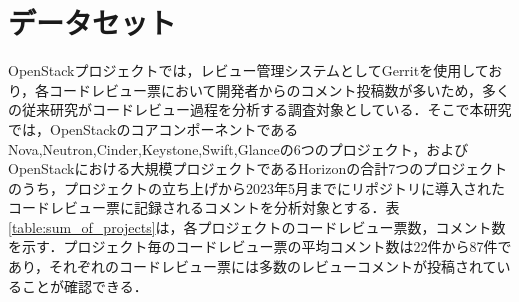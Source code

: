 \documentclass[11pt]{jreport}
\newcommand{\todo}[1]{\colorbox{yellow}{{\bf TODO}:}{\color{red} {\textbf{[#1]}}}}
\begin{document}
\section{データセット}
OpenStackプロジェクトでは，レビュー管理システムとしてGerritを使用しており，各コードレビュー票において開発者からのコメント投稿数が多いため，多くの従来研究がコードレビュー過程を分析する調査対象としている．そこで本研究では，OpenStackのコアコンポーネントであるNova,Neutron,Cinder,Keystone,Swift,Glanceの6つのプロジェクト，およびOpenStackにおける大規模プロジェクトであるHorizonの合計7つのプロジェクトのうち，プロジェクトの立ち上げから2023年5月までにリポジトリに導入されたコードレビュー票に記録されるコメントを分析対象とする．表\ref{table:sum_of_projects}は，各プロジェクトのコードレビュー票数，コメント数を示す．プロジェクト毎のコードレビュー票の平均コメント数は22件から87件であり，それぞれのコードレビュー票には多数のレビューコメントが投稿されていることが確認できる．


\begin{table}[t]
\centering
  \caption{各プロジェクトにおいて導入されたコードレビュー票数とコメント数}
  \vspace{+1mm}
  \label{table:sum_of_projects}
\end{table}
\end{document}
